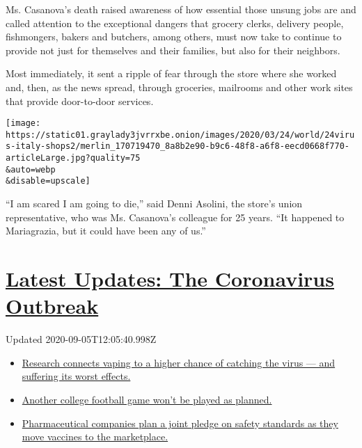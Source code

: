 Ms. Casanova's death raised awareness of how essential those unsung jobs
are and called attention to the exceptional dangers that grocery clerks,
delivery people, fishmongers, bakers and butchers, among others, must
now take to continue to provide not just for themselves and their
families, but also for their neighbors.

Most immediately, it sent a ripple of fear through the store where she
worked and, then, as the news spread, through groceries, mailrooms and
other work sites that provide door-to-door services.

\texttt{[image: https://static01.graylady3jvrrxbe.onion/images/2020/03/24/world/24virus-italy-shops2/merlin\_170719470\_8a8b2e90-b9c6-48f8-a6f8-eecd0668f770-articleLarge.jpg?quality=75\\\&auto=webp\\\&disable=upscale]}

``I am scared I am going to die,'' said Denni Asolini, the store's union
representative, who was Ms. Casanova's colleague for 25 years. ``It
happened to Mariagrazia, but it could have been any of us.''

\hypertarget{latest-updates-the-coronavirus-outbreak}{%
\section{\texorpdfstring{\href{https://www.nytimes3xbfgragh.onion/2020/09/04/world/covid-19-coronavirus.html?action=click\&pgtype=Article\&state=default\&region=MAIN_CONTENT_1\&context=storylines_live_updates}{Latest
Updates: The Coronavirus
Outbreak}}{Latest Updates: The Coronavirus Outbreak}}\label{latest-updates-the-coronavirus-outbreak}}

Updated 2020-09-05T12:05:40.998Z

\begin{itemize}
\tightlist
\item
  \href{https://www.nytimes3xbfgragh.onion/2020/09/04/world/covid-19-coronavirus.html?action=click\&pgtype=Article\&state=default\&region=MAIN_CONTENT_1\&context=storylines_live_updates\#link-1654f6ad}{Research
  connects vaping to a higher chance of catching the virus --- and
  suffering its worst effects.}
\item
  \href{https://www.nytimes3xbfgragh.onion/2020/09/04/world/covid-19-coronavirus.html?action=click\&pgtype=Article\&state=default\&region=MAIN_CONTENT_1\&context=storylines_live_updates\#link-52e4198a}{Another
  college football game won't be played as planned.}
\item
  \href{https://www.nytimes3xbfgragh.onion/2020/09/04/world/covid-19-coronavirus.html?action=click\&pgtype=Article\&state=default\&region=MAIN_CONTENT_1\&context=storylines_live_updates\#link-181cef0}{Pharmaceutical
  companies plan a joint pledge on safety standards as they move
  vaccines to the marketplace.}
\end{itemize}

